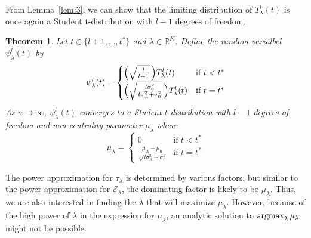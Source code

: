 \documentclass[final]{IEEEtran}
\newtheorem{theorem}{Theorem}
\theoremstyle{definition}
\newcommand{\argmax}{\operatornamewithlimits{argmax}}
\begin{document}
From Lemma~\ref{lem:3}, we can show that the limiting distribution of
$T_{\lambda}^{l}(t)$ is once again a Student t-distribution with
$l-1$ degrees of freedom.
\begin{theorem}
  \label{thm:5}
  Let $t \in \{l+1, \dots, t^{*}\}$ and $\lambda \in
  \mathbb{R}^{K}$. Define the random varialbel $\psi_{\lambda}^{l}(t)$
  by
  \begin{equation}
    \label{eq:50}
    \psi_{\lambda}^{l}(t) = \begin{cases}
      \Bigl(\sqrt{\tfrac{l}{l+1}}\,\Bigr) T_{\lambda}^{l}(t) & \text{if $t <
        t^{*}$} \\
      \Bigl(\sqrt{\tfrac{l \sigma_0^{2}}{l \sigma_A^{2} + \sigma_0^{2}} }\,\Bigr)
      T_{\lambda}^{l}(t) & \text{if $t = t^{*}$}
        \end{cases}
  \end{equation}
  As $n \rightarrow \infty$, $\psi_{\lambda}^{l}(t)$ converges to a Student $t$-distribution with $l - 1$ degrees of freedom and
  non-centrality parameter $\mu_{\lambda}$ where
  \begin{equation}
    \label{eq:51}
    \mu_{\lambda} = \begin{cases} 0 & \text{if $t < t^{*}$} \\
      \frac{\mu_A - \mu_0}{\sqrt{l \sigma_A^{2} + \sigma_0^{2}}} &
       \text{if $t = t^{*}$}
      \end{cases}
  \end{equation}
\end{theorem}
The power approximation for $\tau_{\lambda}$ is determined by various
factors, but similar to the power approximation for
$\mathcal{E}_{\lambda}$, the dominating factor is likely to be
  $\mu_\lambda$. Thus, we are also interested in finding the $\lambda$
  that will maximize $\mu_\lambda$. However, because of the high power
  of $\lambda$ in the expression for $\mu_{\lambda}$, an analytic
  solution to $\argmax_{\lambda}{\mu_{\lambda}}$ might not be possible.
\end{document}
